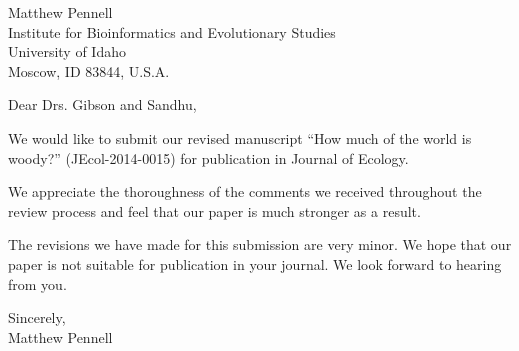 \documentclass[a4paper,12pt]{article}
\begin{document}
{\raggedleft
  Matthew Pennell\\
  Institute for Bioinformatics and Evolutionary Studies\\
  University of Idaho\\
 Moscow, ID 83844, U.S.A.\\[2ex]
}

\vspace{3ex}

Dear Drs. Gibson and Sandhu,

We would like to submit our revised manuscript ``How much of the world is woody?'' (JEcol-2014-0015) 
for publication in Journal of Ecology.

We appreciate the thoroughness of the comments we received throughout the review process and feel that our paper is much stronger as a result.

The revisions we have made for this submission are very minor. We hope that our paper is not suitable for publication in your journal. We look forward to hearing from you.

\begin{flushright}
\vspace{2ex}
\hspace{.2\textwidth}Sincerely,\\
\hspace*{.3\textwidth}
Matthew Pennell
\end{flushright}
\end{document}

